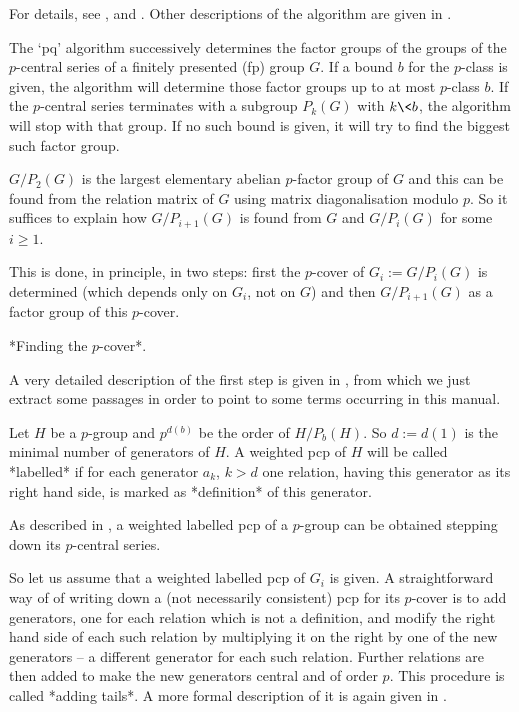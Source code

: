 
For details,  see  \cite{HN80},  \cite{NO96}  and  \cite{VL84}.  Other
descriptions of the algorithm are given in \cite{Sims94}.

The `pq' algorithm successively determines the factor  groups  of  the
groups of the $p$-central series of a finitely  presented  (fp)  group
$G$. If a bound $b$ for the $p$-class is  given,  the  algorithm  will
determine those factor groups up to at  most  $p$-class  $b$.  If  the
$p$-central series terminates with a subgroup $P_k(G)$ with $k \<  b$,
the algorithm will stop with that group. If no such bound is given, it
will try to find the biggest such factor group.

$G/P_2(G)$ is  the largest elementary abelian $p$-factor  group of $G$
and this  can be found  from the relation  matrix of $G$  using matrix
diagonalisation   modulo  $p$.   So   it  suffices   to  explain   how
$G/P_{i+1}(G)$ is found from $G$ and $G/P_i(G)$ for some $i \ge 1$.

This  is  done, in  principle,  in  two  steps:  first  the  $p$-cover
of $G_i := G/P_i(G)$ is determined (which depends only on
$G_i$, not on  $G$) and then $G/P_{i+1}(G)$ as a  factor group of this
$p$-cover.

*Finding the $p$-cover*.

A very detailed description of  the first step is given in \cite{NNN98},
from which  we just extract  some passages in  order to point  to some
terms occurring in this manual.

Let $H$ be a $p$-group and $p^{d(b)}$ be the order of  $H/P_b(H)$.  So
$d := d(1)$ is the minimal number of generators of $H$. A weighted pcp
of $H$ will be called *labelled* if for each generator $a_k$, $k >  d$
one relation, having this generator as its right hand side, is  marked
as *definition* of this generator.

As described in \cite{NNN98}, a weighted labelled pcp of  a  $p$-group
can be obtained stepping down its $p$-central series.

So let us assume that a weighted labelled pcp of  $G_i$  is  given.  A
straightforward way of of writing down a (not necessarily  consistent)
pcp for its $p$-cover is to add  generators,  one  for  each  relation
which is not a definition, and modify the right hand side of each such
relation by multiplying it on the right by one of the  new  generators
-- a different generator for each such relation. Further relations are
then added to make the new generators central and of order  $p$.  This
procedure is called *adding tails*. A more formal description of it is
again given in \cite{NNN98}.

